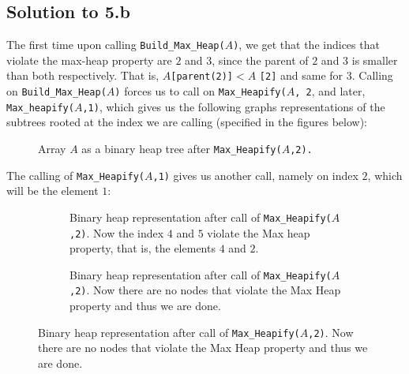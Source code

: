 \documentclass{article}
\begin{document}
\subsection*{Solution to 5.b}
The first time upon calling \texttt{Build\_Max\_Heap($A$)}, we get
that the indices that violate the max-heap property are $2$ and $3$, since the parent 
of $2$ and $3$ is smaller than both respectively. That is, $A$\texttt{[parent(2)]}$<A$
\texttt{[2]} and same for $3$. 
Calling on \texttt{Build\_Max\_Heap($A$)} forces us to call on \texttt{Max\_Heapify($A$,
2}, and later, \texttt{Max\_heapify($A$,1)},
which gives us the following graphs representations of the subtrees rooted at the
index we are calling (specified in the figures below):
\begin{figure}[htpb]
    \centering
{}
\caption{Array $A$ as a binary heap tree after \texttt{Max\_Heapify($A$,2).}}
\end{figure}
The calling of \texttt{Max\_Heapify($A$,1)} gives us another call, namely on index 
$2$, which will be the element $1$:
\begin{figure}[htpb]
    \begin{subfigure}[h]{0.4\linewidth}
\caption{Binary heap representation after call of \texttt{Max\_Heapify($A$,2)}.
Now the index $4$ and $5$ violate the Max heap property, that is, the elements $4$ and
$2$.}
\end{subfigure} 
\hfill
\begin{subfigure}[h]{0.4\linewidth}
\caption{Binary heap representation after call of \texttt{Max\_Heapify($A$,2)}. 
Now there are no nodes that violate the Max Heap property and thus we are done.}
\end{subfigure}
\end{figure}
\newpage
\end{document}
